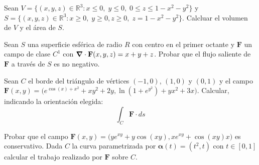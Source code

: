 
\begin{question}
    Sean  $V=\{ (x,y,z) \in \mathbb{R}^{3}:  x\leq 0, \;  y
        \leq 0, \;  0 \leq  z \leq 1-x^{2}-y^{2}  \}$ y
    $S=\{ (x,y,z) \in \mathbb{R}^{3}:  x\geq 0, \; y \geq 0,
        z\geq 0,\;  z = 1-x^{2}-y^{2}  \}$.
    Calcluar el volumen de $V$ y el \'area de $S$.
\end{question}


\begin{question}
    Sean  $S$ una superficie  esf\'erica de radio $R$ con
    centro en el primer octante  y  $\mathbf{F}$ un campo de
    clase $C^{1}$  con $\grad\cdot\mathbf{F}(x,y,z) = x+y+z$.
    Probar que  el flujo saliente de $\mathbf{F}$ a trav\'es de
    $S$  es no negativo.
\end{question}


\begin{question}
    Sean  $C$ el borde del tri\'angulo de v\'ertices $(-1,0)$,
    $(1,0)$ y $(0,1)$ y el campo $\mathbf{F}(x,y) =
        \Big(e^{\cos(x)+x^{2}}+xy^{2}+2y, \ln(1+e^{y^{2}}) +yx^{2}+3x \Big).$
    Calcular,  indicando la orientaci\'on elegida:
    $$ \int_{C} \mathbf{F}\cdot ds$$
\end{question}


\begin{question}
    Probar que el campo $\mathbf{F}(x,y) = \Big(y e^{xy}+y\cos(xy)
        ,xe^{xy}+\cos(xy) x \Big)$ es conservativo.  Dada $C$ la curva
    parametrizada por $\boldsymbol{\alpha}(t) = (t^{2},t)$ con $t
        \in [0,1]$ calcular el trabajo realizado por $\mathbf{F}$ sobre $C.$
\end{question}

\newpage


